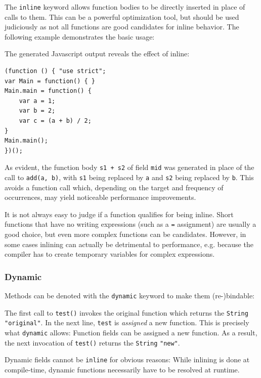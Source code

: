 \documentclass{article}
\newcommand{\target}[1]{#1}
\newcommand{\type}[1]{\texttt{#1}}
\newcommand{\expr}[1]{\texttt{#1}}
\begin{document}
The \expr{inline} keyword allows function bodies to be directly inserted in place of calls to them. This can be a powerful optimization tool, but should be used judiciously as not all functions are good candidates for inline behavior. The following example demonstrates the basic usage:



The generated \target{Javascript} output reveals the effect of inline:

\begin{lstlisting}
(function () { "use strict";
var Main = function() { }
Main.main = function() {
	var a = 1;
	var b = 2;
	var c = (a + b) / 2;
}
Main.main();
})();
\end{lstlisting}

As evident, the function body \expr{s1 + s2} of field \expr{mid} was generated in place of the call to \expr{add(a, b)}, with \expr{s1} being replaced by \expr{a} and \expr{s2} being replaced by \expr{b}. This avoids a function call which, depending on the target and frequency of occurrences, may yield noticeable performance improvements.

It is not always easy to judge if a function qualifies for being inline. Short functions that have no writing expressions (such as a \expr{=} assignment) are usually a good choice, but even more complex functions can be candidates. However, in some cases inlining can actually be detrimental to performance, e.g. because the compiler has to create temporary variables for complex expressions.

\subsubsection{Dynamic}
\label{Dynamic}

Methods can be denoted with the \expr{dynamic} keyword to make them (re-)bindable:



The first call to \expr{test()} invokes the original function which returns the \type{String} \expr{"original"}. In the next line, \expr{test} is \emph{assigned} a new function. This is precisely what \expr{dynamic} allows: Function fields can be assigned a new function. As a result, the next invocation of \expr{test()} returns the \type{String} \expr{"new"}.

Dynamic fields cannot be \expr{inline} for obvious reasons: While inlining is done at compile-time, dynamic functions necessarily have to be resolved at runtime.
\end{document}
